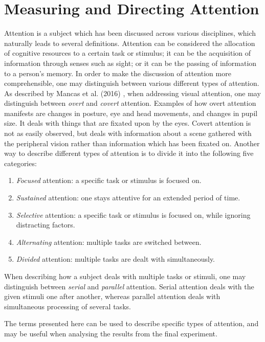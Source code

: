 \chapter{Measuring and Directing Attention}\label{ch:attention}
Attention is a subject which has been discussed across various disciplines, which naturally leads to several definitions. Attention can be considered the allocation of cognitive resources to a certain task or stimulus; it can be the acquisition of information through senses such as sight; or it can be the passing of information to a person’s memory. In order to make the discussion of attention more comprehensible, one may distinguish between various different types of attention. As described by Mancas et al. (2016) \cite{Mancas2016}, when addressing visual attention, one may distinguish between \textit{overt} and \textit{covert} attention. Examples of how overt attention manifests are changes in posture, eye and head movements, and changes in pupil size. It deals with things that are fixated upon by the eyes. Covert attention is not as easily observed, but deals with information about a scene gathered with the peripheral vision rather than information which has been fixated on. Another way to describe different types of attention is to divide it into the following five categories:

\begin{enumerate}
\item \textit{Focused} attention: a specific task or stimulus is focused on.
\item \textit{Sustained} attention: one stays attentive for an extended period of time.
\item \textit{Selective} attention: a specific task or stimulus is focused on, while ignoring distracting factors.
\item \textit{Alternating} attention: multiple tasks are switched between.
\item \textit{Divided} attention: multiple tasks are dealt with simultaneously.
\end{enumerate}

When describing how a subject deals with multiple tasks or stimuli, one may distinguish between \textit{serial} and \textit{parallel} attention. Serial attention deals with the given stimuli one after another, whereas parallel attention deals with simultaneous processing of several tasks.

The terms presented here can be used to describe specific types of attention, and may be useful when analysing the results from the final experiment.

